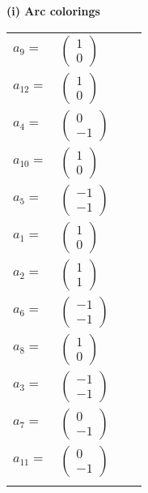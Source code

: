 \documentclass[1p]{elsarticle_modified}
\theoremstyle{definition}
\begin{document}
\flushleft \textbf{(i) Arc colorings}\\
\begin{tabular}{m{7pt} m{180pt} m{7pt} m{180pt} }
\flushright $a_{9}=$&$\begin{pmatrix}1\\0\end{pmatrix}$ \\
\flushright $a_{12}=$&$\begin{pmatrix}1\\0\end{pmatrix}$ \\
\flushright $a_{4}=$&$\begin{pmatrix}0\\-1\end{pmatrix}$ \\
\flushright $a_{10}=$&$\begin{pmatrix}1\\0\end{pmatrix}$ \\
\flushright $a_{5}=$&$\begin{pmatrix}-1\\-1\end{pmatrix}$ \\
\flushright $a_{1}=$&$\begin{pmatrix}1\\0\end{pmatrix}$ \\
\flushright $a_{2}=$&$\begin{pmatrix}1\\1\end{pmatrix}$ \\
\flushright $a_{6}=$&$\begin{pmatrix}-1\\-1\end{pmatrix}$ \\
\flushright $a_{8}=$&$\begin{pmatrix}1\\0\end{pmatrix}$ \\
\flushright $a_{3}=$&$\begin{pmatrix}-1\\-1\end{pmatrix}$ \\
\flushright $a_{7}=$&$\begin{pmatrix}0\\-1\end{pmatrix}$ \\
\flushright $a_{11}=$&$\begin{pmatrix}0\\-1\end{pmatrix}$\\&\end{tabular}
\end{document}
